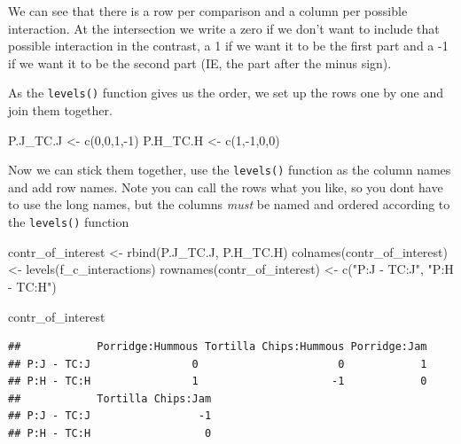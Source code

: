 \documentclass[
]{book}
\newenvironment{Shaded}{\begin{snugshade}}{\end{snugshade}}
\newcommand{\DecValTok}[1]{\textcolor[rgb]{0.00,0.00,0.81}{#1}}
\newcommand{\FunctionTok}[1]{\textcolor[rgb]{0.00,0.00,0.00}{#1}}
\newcommand{\NormalTok}[1]{#1}
\newcommand{\OtherTok}[1]{\textcolor[rgb]{0.56,0.35,0.01}{#1}}
\newcommand{\SpecialCharTok}[1]{\textcolor[rgb]{0.00,0.00,0.00}{#1}}
\newcommand{\StringTok}[1]{\textcolor[rgb]{0.31,0.60,0.02}{#1}}
\begin{document}
We can see that there is a row per comparison and a column per possible interaction. At the intersection we write a zero if we don't want to include that possible interaction in the contrast, a 1 if we want it to be the first part and a -1 if we want it to be the second part (IE, the part after the minus sign).

As the \texttt{levels()} function gives us the order, we set up the rows one by one and join them together.

\begin{Shaded}
\begin{Highlighting}[]
\NormalTok{P.J\_TC.J }\OtherTok{\textless{}{-}} \FunctionTok{c}\NormalTok{(}\DecValTok{0}\NormalTok{,}\DecValTok{0}\NormalTok{,}\DecValTok{1}\NormalTok{,}\SpecialCharTok{{-}}\DecValTok{1}\NormalTok{)}
\NormalTok{P.H\_TC.H }\OtherTok{\textless{}{-}} \FunctionTok{c}\NormalTok{(}\DecValTok{1}\NormalTok{,}\SpecialCharTok{{-}}\DecValTok{1}\NormalTok{,}\DecValTok{0}\NormalTok{,}\DecValTok{0}\NormalTok{)}
\end{Highlighting}
\end{Shaded}

Now we can stick them together, use the \texttt{levels()} function as the column names and add row names. Note you can call the rows what you like, so you dont have to use the long names, but the columns \emph{must} be named and ordered according to the \texttt{levels()} function

\begin{Shaded}
\begin{Highlighting}[]
\NormalTok{contr\_of\_interest }\OtherTok{\textless{}{-}} \FunctionTok{rbind}\NormalTok{(P.J\_TC.J, P.H\_TC.H)}
\FunctionTok{colnames}\NormalTok{(contr\_of\_interest) }\OtherTok{\textless{}{-}} \FunctionTok{levels}\NormalTok{(f\_c\_interactions)}
\FunctionTok{rownames}\NormalTok{(contr\_of\_interest) }\OtherTok{\textless{}{-}} \FunctionTok{c}\NormalTok{(}\StringTok{"P:J {-} TC:J"}\NormalTok{,}
          \StringTok{"P:H {-} TC:H"}\NormalTok{)}

\NormalTok{contr\_of\_interest}
\end{Highlighting}
\end{Shaded}

\begin{verbatim}
##            Porridge:Hummous Tortilla Chips:Hummous Porridge:Jam
## P:J - TC:J                0                      0            1
## P:H - TC:H                1                     -1            0
##            Tortilla Chips:Jam
## P:J - TC:J                 -1
## P:H - TC:H                  0
\end{verbatim}
\end{document}

